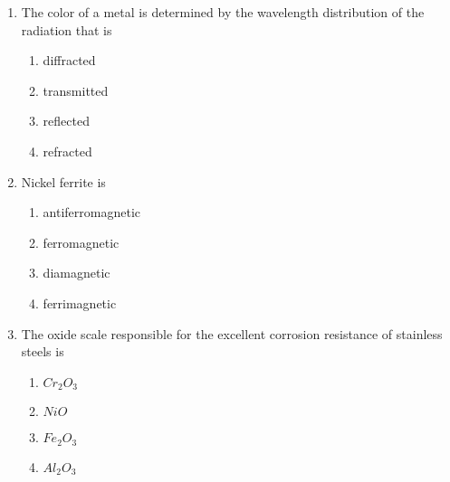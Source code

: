 \documentclass[journal]{IEEEtran}
\begin{document}
\begin{enumerate}
    \item The color of a metal is determined by the wavelength distribution of the radiation that is

        \begin{multicols}{4}
            \begin{enumerate}
                \item diffracted
                \item transmitted
                \item reflected
                \item refracted
            \end{enumerate}
        \end{multicols}

    \item Nickel ferrite is

        \begin{multicols}{4}
            \begin{enumerate}
                \item antiferromagnetic
                \item ferromagnetic
                \item diamagnetic
                \item ferrimagnetic
            \end{enumerate}
        \end{multicols}
        
    \item The oxide scale responsible for the excellent corrosion resistance of stainless steels is

        \begin{multicols}{4}
            \begin{enumerate}
                \item $Cr_2O_3$
                \item $NiO$
                \item $Fe_2O_3$
                \item $Al_2O_3$
            \end{enumerate}
        \end{multicols}

\end{enumerate}
\end{document}
